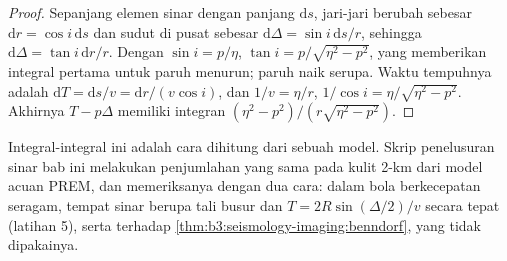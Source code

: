 \begin{proof}
Sepanjang elemen sinar dengan panjang $\mathrm ds$, jari-jari berubah sebesar
$\mathrm dr = \cos i\,\mathrm ds$ dan sudut di pusat sebesar
$\mathrm d\Delta = \sin i\,\mathrm ds/r$, sehingga $\mathrm d\Delta = \tan i\,\mathrm dr/r$.
Dengan $\sin i = p/\eta$, $\tan i = p/\sqrt{\eta^2 - p^2}$, yang memberikan integral pertama
untuk paruh menurun; paruh naik serupa. Waktu tempuhnya adalah
$\mathrm dT = \mathrm ds/v = \mathrm dr/(v\cos i)$, dan $1/v = \eta/r$,
$1/\cos i = \eta/\sqrt{\eta^2 - p^2}$. Akhirnya $T - p\Delta$ memiliki integran
$(\eta^2 - p^2)/(r\sqrt{\eta^2 - p^2})$.
\end{proof}

Integral-integral ini adalah cara  dihitung dari sebuah model. Skrip
penelusuran sinar bab ini melakukan penjumlahan yang sama pada kulit 2-km dari
model acuan PREM, %
dan memeriksanya dengan dua cara: dalam bola berkecepatan seragam, tempat sinar berupa
tali busur dan $T = 2R\sin(\Delta/2)/v$ secara tepat (latihan 5), serta terhadap
\cref{thm:b3:seismology-imaging:benndorf}, yang tidak dipakainya.

